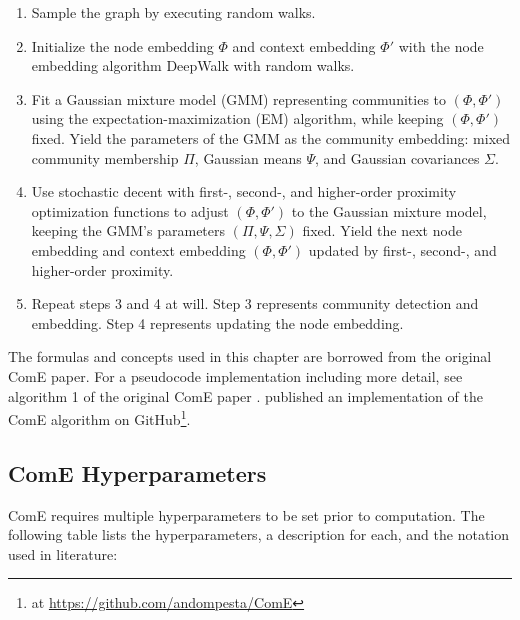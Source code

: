 \documentclass[conference]{IEEEtran}
\begin{document}
\begin{enumerate}
    \item Sample the graph by executing random walks.
    \item Initialize the node embedding $\Phi$ and context embedding $\Phi'$ with the node embedding algorithm DeepWalk\cite{Perozzi2014DeepWalkOL} with random walks.
    \item Fit a Gaussian mixture model (GMM) representing communities to $(\Phi, \Phi')$ using the expectation-maximization (EM) algorithm, while keeping $(\Phi, \Phi')$ fixed. Yield the parameters of the GMM as the community embedding: mixed community membership $\Pi$, Gaussian means $\Psi$, and Gaussian covariances $\Sigma$.
    \item Use stochastic decent with first-, second-, and higher-order proximity optimization functions to adjust $(\Phi, \Phi')$ to the Gaussian mixture model, keeping the GMM's parameters $(\Pi, \Psi, \Sigma)$ fixed. Yield the next node embedding and context embedding $(\Phi, \Phi')$ updated by first-, second-, and higher-order proximity.
    \item Repeat steps 3 and 4 at will. Step 3 represents community detection and embedding. Step 4 represents updating the node embedding.
\end{enumerate}

The formulas and concepts used in this chapter are borrowed from the original ComE paper.\cite{ComE} For a pseudocode implementation including more detail, see algorithm 1 of the original ComE paper \cite{ComE}. \citeauthor{ComE_GH} published an implementation of the ComE algorithm on GitHub\footnote{at \url{https://github.com/andompesta/ComE}}.

\subsection{ComE Hyperparameters}
\label{sec:ComE_params}

ComE requires multiple hyperparameters to be set prior to computation. The following table lists the hyperparameters, a description for each, and the notation used in literature:
\end{document}
